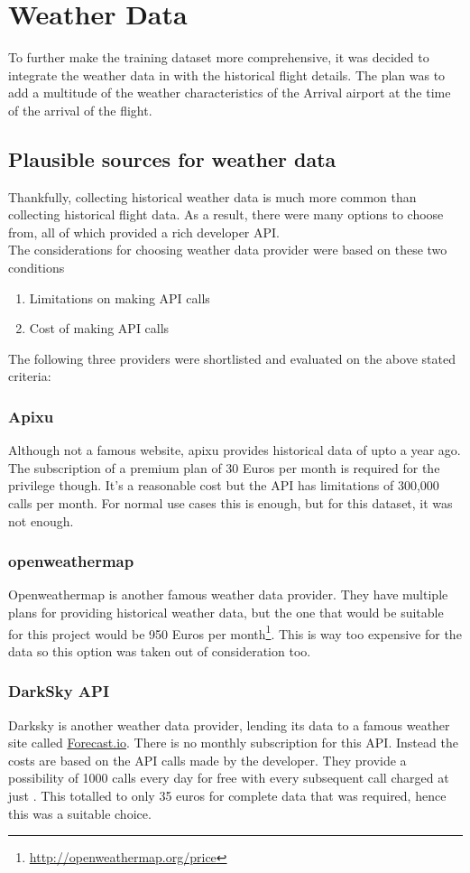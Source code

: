 \chapter{Weather Data}
To further make the training dataset more comprehensive, it was decided to integrate the weather data in with the historical flight details. The plan was to add a multitude of the weather characteristics of the Arrival airport at the time of the arrival of the flight.

\section{Plausible sources for weather data}
Thankfully, collecting historical weather data is much more common than collecting historical flight data. As a result, there were many options to choose from, all of which provided a rich developer API.
\\The considerations for choosing weather data provider were based on these two conditions
\begin{enumerate}
    \item Limitations on making API calls
    \item Cost of making API calls
\end{enumerate}
The following three providers were shortlisted and evaluated on the above stated criteria:

\subsection{Apixu}
Although not a famous website, apixu provides historical data of upto a year ago. The subscription of a premium plan of 30 Euros per month is required for the privilege though. It's a reasonable cost but the API has limitations of 300,000 calls per month. For normal use cases this is enough, but for this dataset, it was not enough.

\subsection{openweathermap}
Openweathermap is another famous weather data provider. They have multiple plans for providing historical weather data, but the one that would be suitable for this project would be 950 Euros per month\footnote{\url{http://openweathermap.org/price}}. This is way too expensive for the data so this option was taken out of consideration too.

\subsection{DarkSky API}
Darksky is another weather data provider, lending its data to a famous weather site called \url{Forecast.io}. There is no monthly subscription for this API. Instead the costs are based on the API calls made by the developer. They provide a possibility of 1000 calls every day for free with every subsequent call charged at just . This totalled to only 35 euros for complete data that was required, hence this was a suitable choice. 

